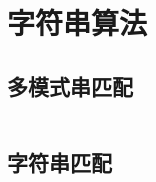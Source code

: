 \chapter{字符串算法}

\section{多模式串匹配}

\inputminted{cpp}{code/String/MultiplePatternMatch.cpp}

\section{字符串匹配}

\inputminted{cpp}{code/String/StringMatch.cpp}
